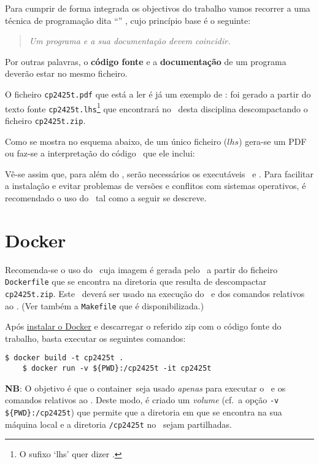 \documentclass[11pt, a4paper, fleqn]{article}
\newcommand{\Varid}[1]{\mathit{#1}}
\begin{document}
Para cumprir de forma integrada os objectivos do trabalho vamos recorrer
a uma técnica de programa\-ção dita ``'' \cite{Kn92}, cujo
princípio base é o seguinte:
%
\begin{quote}\em
	Um programa e a sua documentação devem coincidir.
\end{quote}
%
Por outras palavras, o \textbf{código fonte} e a \textbf{documentação} de um
programa deverão estar no mesmo ficheiro.

O ficheiro \texttt{cp2425t.pdf} que está a ler é já um exemplo de
: foi gerado a partir do texto fonte
\texttt{cp2425t.lhs}\footnote{O sufixo `lhs' quer dizer
\emph{}.} que encontrará no \MaterialPedagogico\
desta disciplina des\-com\-pactando o ficheiro \texttt{cp2425t.zip}.

Como se mostra no esquema abaixo, de um único ficheiro (\ensuremath{\Varid{lhs}})
gera-se um PDF ou faz-se a interpretação do código \Haskell\ que ele inclui:

	\esquema

Vê-se assim que, para além do \GHCi, serão necessários os executáveis \PdfLatex\ e
\LhsToTeX. Para facilitar a instalação e evitar problemas de versões e
conflitos com sistemas operativos, é recomendado o uso do \Docker\ tal como
a seguir se descreve.

\section{Docker} \label{sec:docker}

Recomenda-se o uso do \container\ cuja imagem é gerada pelo \Docker\ a partir do ficheiro
\texttt{Dockerfile} que se encontra na diretoria que resulta de descompactar
\texttt{cp2425t.zip}. Este \container\ deverá ser usado na execução
do \GHCi\ e dos comandos relativos ao \Latex. (Ver também a \texttt{Makefile}
que é disponibilizada.)

Após \href{https://docs.docker.com/engine/install/}{instalar o Docker} e
descarregar o referido zip com o código fonte do trabalho,
basta executar os seguintes comandos:
\begin{Verbatim}[fontsize=\small]
    $ docker build -t cp2425t .
    $ docker run -v ${PWD}:/cp2425t -it cp2425t
\end{Verbatim}
\textbf{NB}: O objetivo é que o container\ seja usado \emph{apenas} 
para executar o \GHCi\ e os comandos relativos ao \Latex.
Deste modo, é criado um \textit{volume} (cf.\ a opção \texttt{-v \$\{PWD\}:/cp2425t}) 
que permite que a diretoria em que se encontra na sua máquina local 
e a diretoria \texttt{/cp2425t} no \container\ sejam partilhadas.
\end{document}
